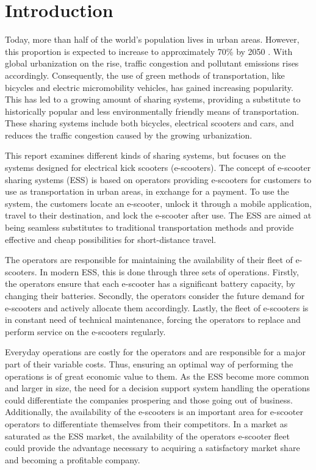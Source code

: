 \chapter{Introduction}  \label{introduction}
\nocite{imt_software_wiki}  %

Today, more than half of the world’s population lives in urban areas. However, this proportion is expected to increase to approximately 70\% by 2050 \citep{nations_68_2018}. With global urbanization on the rise, traffic congestion and pollutant emissions rises accordingly. Consequently, the use of green methods of transportation, like bicycles and electric micromobility vehicles, has gained increasing popularity. This has led to a growing amount of sharing systems, providing a substitute to historically popular and less environmentally friendly means of transportation. These sharing systems include both bicycles, electrical scooters and cars, and reduces the traffic congestion caused by the growing urbanization. 

This report examines different kinds of sharing systems, but focuses on the systems designed for electrical kick scooters (e-scooters). The concept of e-scooter sharing systems (ESS) is based on operators providing e-scooters for customers to use as transportation in urban areas, in exchange for a payment. To use the system, the customers locate an e-scooter, unlock it through a mobile application, travel to their destination, and lock the e-scooter after use. The ESS are aimed at being seamless substitutes to traditional transportation methods and provide effective and cheap possibilities for short-distance travel.

The operators are responsible for maintaining the availability of their fleet of e-scooters. In modern ESS, this is done through three sets of operations. Firstly, the operators ensure that each e-scooter has a significant battery capacity, by changing their batteries. Secondly, the operators consider the future demand for e-scooters and actively allocate them accordingly. Lastly, the fleet of e-scooters is in constant need of technical maintenance, forcing the operators to replace and perform service on the e-scooters regularly. 

Everyday operations are costly for the operators and are responsible for a major part of their variable costs. Thus, ensuring an optimal way of performing the operations is of great economic value to them. As the ESS become more common and larger in size, the need for a decision support system handling the operations could differentiate the companies prospering and those going out of business. Additionally, the availability of the e-scooters is an important area for e-scooter operators to differentiate themselves from their competitors. In a market as saturated as the ESS market, the availability of the operators e-scooter fleet could provide the advantage necessary to acquiring a satisfactory market share and becoming a profitable company.


